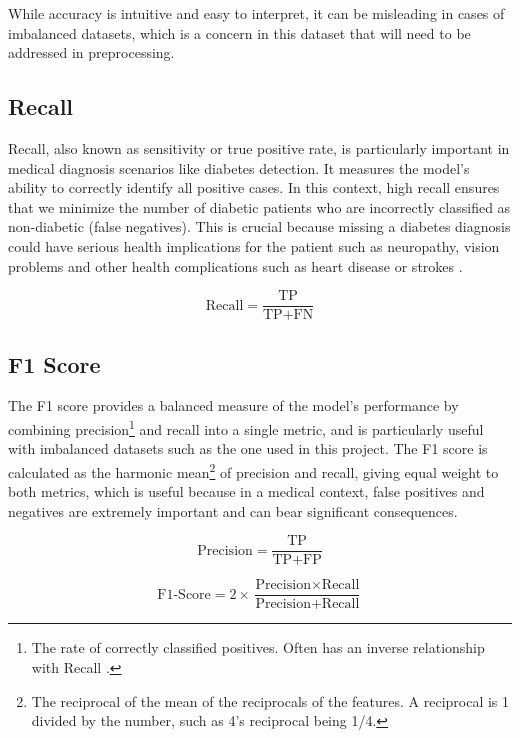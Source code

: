 \documentclass[12pt]{report}
\newcommand{\para}{\vspace{8pt}\noindent}
\begin{document}
\para While accuracy is intuitive and easy to interpret, it can be misleading in cases
of imbalanced datasets, which is a concern in this dataset that will need to be addressed in preprocessing.

\subsection{Recall}
Recall, also known as sensitivity or true positive rate, is particularly important in medical diagnosis scenarios like diabetes detection. It measures
the model's ability to correctly identify all positive cases. In this context, high recall ensures that we minimize the number of diabetic patients
who are incorrectly classified as non-diabetic (false negatives). This is crucial because missing a diabetes diagnosis could have serious health implications for the patient such 
as neuropathy, vision problems and other health complications such as heart disease or strokes \autocite{nhs_type_nodate}.

\begin{equation}\label{eq:Recall}
    \text{Recall} = \frac{\text{TP}}{\text{TP} + \text{FN}}
\end{equation}

\subsection{F1 Score}
The F1 score provides a balanced measure of the model's performance by combining precision\footnote{The rate of correctly classified positives. Often has an inverse relationship with Recall \autocite{google_classification_nodate}.}
and recall into a single metric, and is particularly useful with imbalanced datasets such as the one used in this project.
The F1 score is calculated as the harmonic mean\footnote{The reciprocal of the mean of the reciprocals of the features. A reciprocal is 1 divided by the number, such as 4's reciprocal being 1/4.}
of precision and recall, giving equal weight to both metrics, which is useful because in a medical context, false positives and negatives are extremely important 
and can bear significant consequences.

\begin{equation}\label{eq:Precision}
    \text{Precision} = \frac{\text{TP}}{\text{TP} + \text{FP}}
\end{equation}

\begin{equation}\label{eq:F1Score}
    \text{F1-Score} = 2 \times \frac{\text{Precision} \times \text{Recall}}{\text{Precision} + \text{Recall}}
\end{equation}
\end{document}
